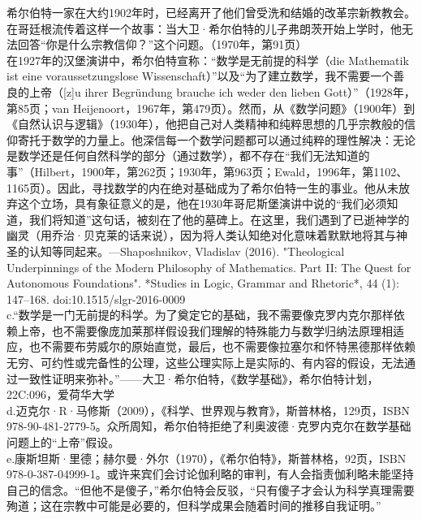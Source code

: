    希尔伯特一家在大约1902年时，已经离开了他们曾受洗和结婚的改革宗新教教会。在哥廷根流传着这样一个故事：当大卫·希尔伯特的儿子弗朗茨开始上学时，他无法回答“你是什么宗教信仰？”这个问题。（1970年，第91页）\\
在1927年的汉堡演讲中，希尔伯特宣称：“数学是无前提的科学（die Mathematik ist eine voraussetzungslose Wissenschaft）”以及“为了建立数学，我不需要一个善良的上帝（[z]u ihrer Begründung brauche ich weder den lieben Gott）”（1928年，第85页；van Heijenoort，1967年，第479页）。然而，从《数学问题》（1900年）到《自然认识与逻辑》（1930年），他把自己对人类精神和纯粹思想的几乎宗教般的信仰寄托于数学的力量上。他深信每一个数学问题都可以通过纯粹的理性解决：无论是数学还是任何自然科学的部分（通过数学），都不存在“我们无法知道的事”（Hilbert，1900年，第262页；1930年，第963页；Ewald，1996年，第1102、1165页）。因此，寻找数学的内在绝对基础成为了希尔伯特一生的事业。他从未放弃这个立场，具有象征意义的是，他在1930年哥尼斯堡演讲中说的“我们必须知道，我们将知道”这句话，被刻在了他的墓碑上。在这里，我们遇到了已逝神学的幽灵（用乔治·贝克莱的话来说），因为将人类认知绝对化意味着默默地将其与神圣的认知等同起来。—Shaposhnikov, Vladislav (2016). "Theological Underpinnings of the Modern Philosophy of Mathematics. Part II: The Quest for Autonomous Foundations". *Studies in Logic, Grammar and Rhetoric*, 44 (1): 147–168. doi:10.1515/slgr-2016-0009\\
c.“数学是一门无前提的科学。为了奠定它的基础，我不需要像克罗内克尔那样依赖上帝，也不需要像庞加莱那样假设我们理解的特殊能力与数学归纳法原理相适应，也不需要布劳威尔的原始直觉，最后，也不需要像拉塞尔和怀特黑德那样依赖无穷、可约性或完备性的公理，这些公理实际上是实际的、有内容的假设，无法通过一致性证明来弥补。”——大卫·希尔伯特，《数学基础》，希尔伯特计划，22C:096，爱荷华大学\\  
d.迈克尔·R·马修斯（2009），《科学、世界观与教育》，斯普林格，129页，ISBN 978-90-481-2779-5。众所周知，希尔伯特拒绝了利奥波德·克罗内克尔在数学基础问题上的“上帝”假设。\\  
e.康斯坦斯·里德；赫尔曼·外尔（1970），《希尔伯特》，斯普林格，92页，ISBN 978-0-387-04999-1。或许来宾们会讨论伽利略的审判，有人会指责伽利略未能坚持自己的信念。“但他不是傻子，”希尔伯特会反驳，“只有傻子才会认为科学真理需要殉道；这在宗教中可能是必要的，但科学成果会随着时间的推移自我证明。”\\